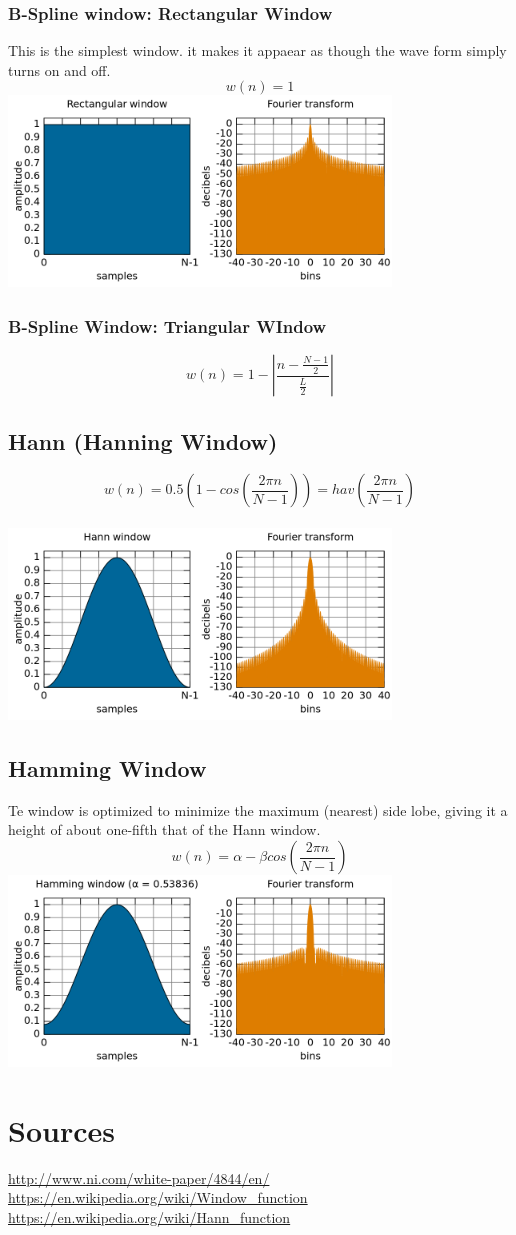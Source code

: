 \documentclass{article}
\begin{document}
\subsubsection*{B-Spline window: Rectangular Window}
This is the simplest window. it makes it appaear as though the wave form simply turns on and off.
$$w(n) = 1$$
\includegraphics[width=4in]{images/rectangular-window.png}


\subsubsection*{B-Spline Window: Triangular WIndow}
$$w(n) = 1 - |\frac{n - \frac{N - 1}{2}}{\frac{L}{2}}|$$

\subsection*{Hann (Hanning Window)}
$$w(n) = 0.5(1 - cos(\frac{2\pi n}{N - 1})) = hav(\frac{2 \pi n}{N - 1})$$ \\
\includegraphics[width=4in]{images/hann-window.png}

\subsection*{Hamming Window}
Te window is optimized to minimize the maximum (nearest) side lobe, giving it a height of about one-fifth that of the Hann window.
$$w(n) = \alpha - \beta cos(\frac{2\pi n}{N - 1})$$
\includegraphics[width=4in]{images/hamming-window.png}


\section*{Sources}
\url{http://www.ni.com/white-paper/4844/en/} \\
\url{https://en.wikipedia.org/wiki/Window_function} \\
\url{https://en.wikipedia.org/wiki/Hann_function} \\
\end{document}
